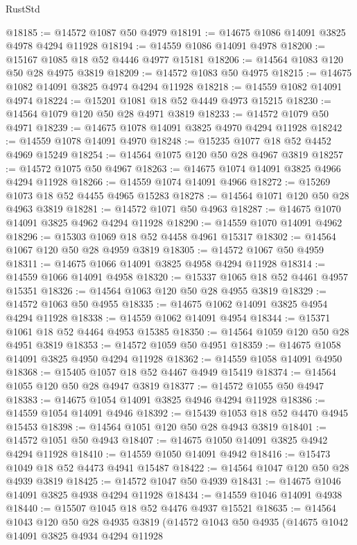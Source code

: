 \begin{lexlean}{RustStd}
\begin{coremodule}
@18185 := @14572 @1087 @50 @4979
@18191 := @14675 @1086 @14091 @3825 @4978 @4294 @11928
@18194 := @14559 @1086 @14091 @4978
@18200 := @15167 @1085 @18 @52 @4446 @4977 @15181
@18206 := @14564 @1083 @120 @50 @28 @4975 @3819
@18209 := @14572 @1083 @50 @4975
@18215 := @14675 @1082 @14091 @3825 @4974 @4294 @11928
@18218 := @14559 @1082 @14091 @4974
@18224 := @15201 @1081 @18 @52 @4449 @4973 @15215
@18230 := @14564 @1079 @120 @50 @28 @4971 @3819
@18233 := @14572 @1079 @50 @4971
@18239 := @14675 @1078 @14091 @3825 @4970 @4294 @11928
@18242 := @14559 @1078 @14091 @4970
@18248 := @15235 @1077 @18 @52 @4452 @4969 @15249
@18254 := @14564 @1075 @120 @50 @28 @4967 @3819
@18257 := @14572 @1075 @50 @4967
@18263 := @14675 @1074 @14091 @3825 @4966 @4294 @11928
@18266 := @14559 @1074 @14091 @4966
@18272 := @15269 @1073 @18 @52 @4455 @4965 @15283
@18278 := @14564 @1071 @120 @50 @28 @4963 @3819
@18281 := @14572 @1071 @50 @4963
@18287 := @14675 @1070 @14091 @3825 @4962 @4294 @11928
@18290 := @14559 @1070 @14091 @4962
@18296 := @15303 @1069 @18 @52 @4458 @4961 @15317
@18302 := @14564 @1067 @120 @50 @28 @4959 @3819
@18305 := @14572 @1067 @50 @4959
@18311 := @14675 @1066 @14091 @3825 @4958 @4294 @11928
@18314 := @14559 @1066 @14091 @4958
@18320 := @15337 @1065 @18 @52 @4461 @4957 @15351
@18326 := @14564 @1063 @120 @50 @28 @4955 @3819
@18329 := @14572 @1063 @50 @4955
@18335 := @14675 @1062 @14091 @3825 @4954 @4294 @11928
@18338 := @14559 @1062 @14091 @4954
@18344 := @15371 @1061 @18 @52 @4464 @4953 @15385
@18350 := @14564 @1059 @120 @50 @28 @4951 @3819
@18353 := @14572 @1059 @50 @4951
@18359 := @14675 @1058 @14091 @3825 @4950 @4294 @11928
@18362 := @14559 @1058 @14091 @4950
@18368 := @15405 @1057 @18 @52 @4467 @4949 @15419
@18374 := @14564 @1055 @120 @50 @28 @4947 @3819
@18377 := @14572 @1055 @50 @4947
@18383 := @14675 @1054 @14091 @3825 @4946 @4294 @11928
@18386 := @14559 @1054 @14091 @4946
@18392 := @15439 @1053 @18 @52 @4470 @4945 @15453
@18398 := @14564 @1051 @120 @50 @28 @4943 @3819
@18401 := @14572 @1051 @50 @4943
@18407 := @14675 @1050 @14091 @3825 @4942 @4294 @11928
@18410 := @14559 @1050 @14091 @4942
@18416 := @15473 @1049 @18 @52 @4473 @4941 @15487
@18422 := @14564 @1047 @120 @50 @28 @4939 @3819
@18425 := @14572 @1047 @50 @4939
@18431 := @14675 @1046 @14091 @3825 @4938 @4294 @11928
@18434 := @14559 @1046 @14091 @4938
@18440 := @15507 @1045 @18 @52 @4476 @4937 @15521
@18635 := @14564
    @1043
    @120
    @50
    @28
    @4935
    @3819
    (@14572
      @1043
      @50
      @4935
      (@14675
        @1042
        @14091
        @3825
        @4934
        @4294
        @11928

\end{coremodule}
\end{lexlean}
